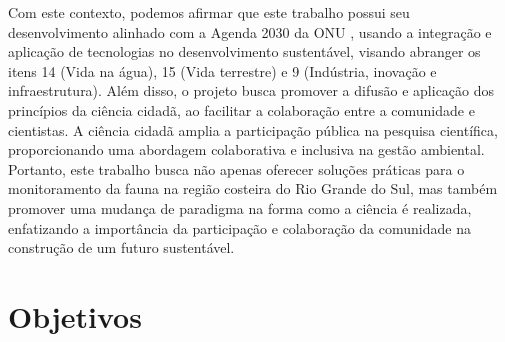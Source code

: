 Com este contexto, podemos afirmar que este trabalho possui seu desenvolvimento alinhado com a Agenda 2030 da ONU \cite{onu2015agenda2030}, usando a integração e aplicação de tecnologias no desenvolvimento sustentável, visando abranger os itens 14 (Vida na água), 15 (Vida terrestre) e 9 (Indústria, inovação e infraestrutura). Além disso, o projeto busca promover a difusão e aplicação dos princípios da ciência cidadã, ao facilitar a colaboração entre a comunidade e cientistas. A ciência cidadã amplia a participação pública na pesquisa científica, proporcionando uma abordagem colaborativa e inclusiva na gestão ambiental. Portanto, este trabalho busca não apenas oferecer soluções práticas para o monitoramento da fauna na região costeira do Rio Grande do Sul, mas também promover uma mudança de paradigma na forma como a ciência é realizada, enfatizando a importância da participação e colaboração da comunidade na construção de um futuro sustentável. 

\section{Objetivos}

